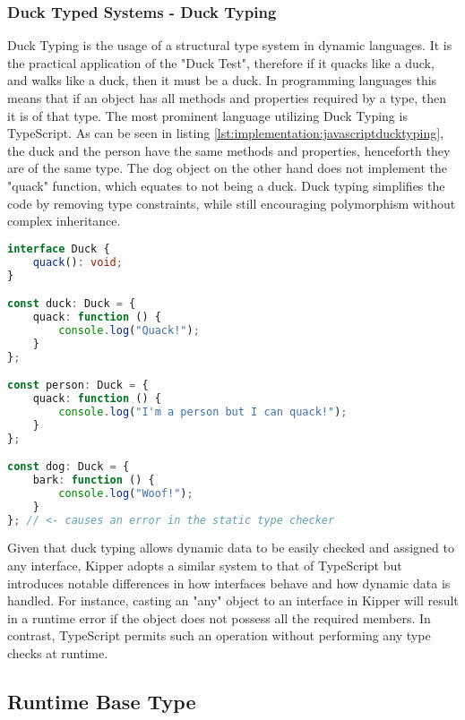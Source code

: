 \subsubsection{Duck Typed Systems - Duck Typing}

Duck Typing is the usage of a structural type system in dynamic languages. It is the practical application of the "Duck Test", therefore if it quacks like a duck, and walks like a duck, then it must be a duck. In programming languages this means that if an object has all methods and properties required by a type, then it is of that type. The most prominent language utilizing Duck Typing is TypeScript. As can be seen in listing \ref{lst:implementation:javascriptducktyping}, the duck and the person have the same methods and properties, henceforth they are of the same type. The dog object on the other hand does not implement the "quack" function, which equates to not being a duck. Duck typing simplifies the code by removing type constraints, while still encouraging polymorphism without complex inheritance.

\begin{lstlisting}[language=Typescript,caption=Example of duck typing in TypeScript,label=lst:implementation:javascriptducktyping]
interface Duck {
	quack(): void;
}

const duck: Duck = {
	quack: function () {
		console.log("Quack!");
	}
};

const person: Duck = {
	quack: function () {
		console.log("I'm a person but I can quack!");
	}
};

const dog: Duck = {
	bark: function () {
		console.log("Woof!");
	}
}; // <- causes an error in the static type checker
\end{lstlisting}

Given that duck typing allows dynamic data to be easily checked and assigned to any interface, Kipper adopts a similar system to that of TypeScript but introduces notable differences in how interfaces behave and how dynamic data is handled. For instance, casting an "any" object to an interface in Kipper will result in a runtime error if the object does not possess all the required members. In contrast, TypeScript permits such an operation without performing any type checks at runtime.

\subsection{Runtime Base Type}
\label{subsec:basetype}

